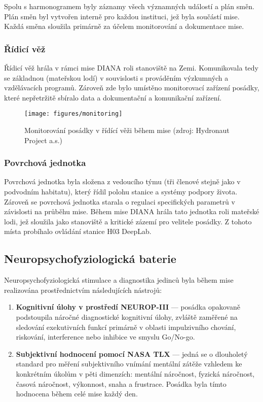 Spolu s harmonogramem byly záznamy všech významných událostí a plán směn. Plán
směn byl vytvořen interně pro každou instituci, jež byla součástí mise. Každá
směna sloužila primárně za účelem monitorování a dokumentace mise.

\subsubsection{Řídicí věž}
\label{subsubsec:ridici_vez}
Řídicí věž hrála v rámci mise DIANA roli stanoviště na Zemi. Komunikovala tedy
se základnou (mateřskou lodí) v souvislosti s prováděním výzkumných a
vzdělávacích programů. Zároveň zde bylo umístěno monitorovací zařízení posádky,
které nepřetržitě sbíralo data a dokumentační a komunikační zařízení.

\begin{figure}[h]
    \begin{center}
        \texttt{[image: figures/monitoring]}
        \caption{Monitorování posádky v řídící věži během mise (zdroj: Hydronaut Project a.s.)}
        \label{fig:monitoring}
    \end{center}
\end{figure}

\subsubsection{Povrchová jednotka}
\label{subsubsec:povrchova_jednotka}
Povrchová jednotka byla složena z vedoucího týmu (tři členové stejně jako v
podvodním habitatu), který řídil polohu stanice a systémy podpory života.
Zároveň se povrchová jednotka starala o regulaci specifických parametrů v
závislosti na průběhu mise. Během mise DIANA hrála tato jednotka roli mateřské
lodi, jež sloužila jako stanoviště a kritické zázemí pro velitele posádky. Z
tohoto místa probíhalo ovládání stanice H03 DeepLab.

\subsection{Neuropsychofyziologická baterie}
\label{subsubsec:neuro_testy}
Neuropsychofyziologická stimulace a diagnostika jedinců byla během mise
realizována prostřednictvím následujících nástrojů:
\begin{enumerate}
    \item \textbf{Kognitivní úlohy v prostředí NEUROP-III} --- posádka opakovaně
          podstoupila náročné diagnostické kognitivní úlohy, zvláště zaměřené na
          sledování exekutivních funkcí primárně v oblasti impulzivního chování,
          riskování, interference nebo inhibice ve smyslu Go/No-go.
    \item \textbf{Subjektivní hodnocení pomocí NASA TLX} --- jedná se o
          dlouholetý standard pro měření subjektivního vnímání mentální zátěže
          vzhledem ke konkrétním úkolům v pěti dimenzích: mentální náročnost, fyzická
          náročnost, časová náročnost, výkonnost, snaha a frustrace. Posádka byla
          tímto hodnocena během celé mise každý den.
\end{enumerate}

